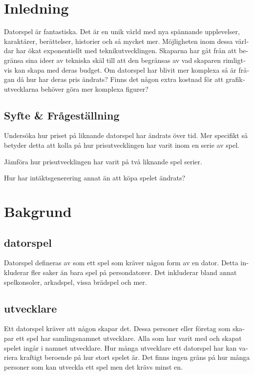 \documentclass[11p]{article}
\begin{document}
    \begin{otherlanguage}{swedish}
    \tableofcontents

    \newpage

\setlength{\parskip}{10pt}

\section{Inledning}
    Datorspel är fantastiska.
    Det är en unik värld med nya spännande upplevelser, karaktärer, berättelser, historier och så mycket mer.
    Möjligheten inom dessa världar har ökat exponentiellt med teknikutvecklingen.
    Skaparna har gåt från att begränsa sina ideer av tekniska skäl till att den begränsas av vad skaparen rimligtvis kan skapa med deras budget.
    Om datorspel har blivit mer komplexa så är frågan då hur har deras pris ändrats?
    Finns det någon extra kostnad för att grafikutvecklarna behöver göra mer komplexa figurer?




\subsection{Syfte & Frågeställning}
    Undersöka hur priset på liknande datorspel har ändrats över tid.
    Mer specifikt så betyder detta att kolla på hur prisutvecklingen har varit inom en serie av spel.

    Jämföra hur prisutvecklingen har varit på två liknande spel serier.

    Hur har intäktsgenerering annat än att köpa spelet ändrats?

\section{Bakgrund}

    \subsection{datorspel}
    Datorspel defineras av \textcite{ComputerSweden} som ett spel som kräver någon form av en dator.
    Detta inkluderar fler saker än bara spel på persondatorer.
    Det inkluderar bland annat spelkonsoler, arkadspel, vissa brädspel och mer.

    \subsection{utvecklare}
    Ett datorspel kräver att någon skapar det.
    Dessa personer eller företag som skapar ett spel har samlingsnamnet utvecklare.
    Alla som har varit med och skapat spelet ingår i namnet utvecklare.
    Hur många utvecklare ett datorspel har kan variera kraftigt beroende på hur stort spelet är.
    Det finns ingen gräns på hur många personer som kan utveckla ett spel men det krävs minst en.


\end{otherlanguage}
\end{document}
